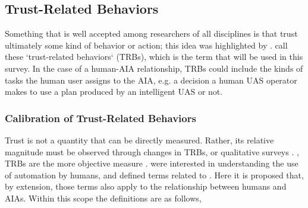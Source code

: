 \subsection{Trust-Related Behaviors} \label{sec:trbs}
Something that is well accepted among researchers of all disciplines is that trust ultimately  some kind of behavior or action; this idea was highlighted by \citet{Lewis1985-pr}.  \citet{McKnight2001-fa} call these `trust-related behaviors` (TRBs), which is the term that will be used in this survey. In the case of a human-AIA relationship,  TRBs could include the kinds of tasks the human user assigns to the AIA, e.g. a decision a human UAS operator makes to use a plan produced by an intelligent UAS or not. 

\subsubsection{Calibration of Trust-Related Behaviors}
    Trust is not a quantity that can be directly measured. Rather, its relative magnitude  must be observed through changes in TRBs, or qualitative surveys . , TRBs are the more objective measure . 
    \citet{Parasuraman1997-co} were interested in understanding the use of automation by humans, and defined terms related to . 
    Here it is proposed that, by extension, those terms also apply to the relationship between humans and AIAs. Within this scope the definitions are as follows,%
    
